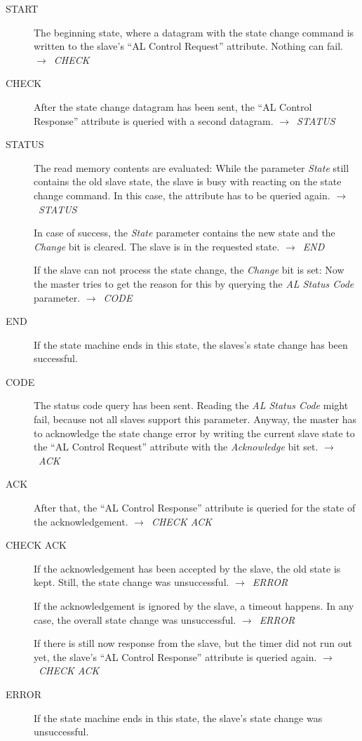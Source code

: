 \documentclass[a4paper,12pt,BCOR6mm,bibtotoc,idxtotoc]{scrbook}
\begin{document}
\begin{description}
\item[START] The beginning state, where a datagram with the state
  change command is written to the slave's ``AL Control Request''
  attribute. Nothing can fail. $\rightarrow$~\textit{CHECK}

\item[CHECK] After the state change datagram has been sent, the ``AL
  Control Response'' attribute is queried with a second datagram.
  $\rightarrow$~\textit{STATUS}

\item[STATUS] The read memory contents are evaluated: While the
  parameter \textit{State} still contains the old slave state, the
  slave is busy with reacting on the state change command. In this
  case, the attribute has to be queried again.
  $\rightarrow$~\textit{STATUS}

  In case of success, the \textit{State} parameter contains the new
  state and the \textit{Change} bit is cleared. The slave is in the
  requested state.  $\rightarrow$~\textit{END}

  If the slave can not process the state change, the \textit{Change}
  bit is set: Now the master tries to get the reason for this by
  querying the \textit{AL Status Code} parameter.
  $\rightarrow$~\textit{CODE}

\item[END] If the state machine ends in this state, the slaves's state
  change has been successful.

\item[CODE] The status code query has been sent. Reading the
  \textit{AL Status Code} might fail, because not all slaves support
  this parameter. Anyway, the master has to acknowledge the state
  change error by writing the current slave state to the ``AL Control
  Request'' attribute with the \textit{Acknowledge} bit set.
  $\rightarrow$~\textit{ACK}

\item[ACK] After that, the ``AL Control Response'' attribute is
  queried for the state of the acknowledgement.
  $\rightarrow$~\textit{CHECK ACK}

\item[CHECK ACK] If the acknowledgement has been accepted by the
  slave, the old state is kept. Still, the state change was
  unsuccessful. $\rightarrow$~\textit{ERROR}

  If the acknowledgement is ignored by the slave, a timeout happens.
  In any case, the overall state change was unsuccessful.
  $\rightarrow$~\textit{ERROR}

  If there is still now response from the slave, but the timer did not
  run out yet, the slave's ``AL Control Response'' attribute is
  queried again.  $\rightarrow$~\textit{CHECK ACK}

\item[ERROR] If the state machine ends in this state, the slave's
  state change was unsuccessful.

\end{description}
\end{document}
